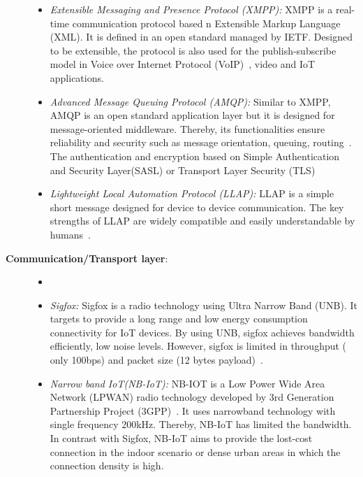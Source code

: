 \begin{description}
\begin{itemize}
    \item \textit{Extensible Messaging and Presence Protocol (XMPP): } XMPP  is a real-time communication protocol based n Extensible Markup Language (XML). It is defined in an open standard managed by IETF. Designed to be extensible, the protocol is also used for the publish-subscribe model in Voice over Internet Protocol (VoIP)~, video and IoT applications. 
    
    \item \textit{Advanced Message Queuing Protocol (AMQP): } Similar to XMPP, AMQP is an open standard application layer but it is designed for message-oriented middleware. Thereby, its functionalities ensure reliability and security such as message orientation, queuing, routing~\cite{o2007toward}. The authentication and encryption based on Simple Authentication and Security Layer(SASL) or Transport Layer Security (TLS)
    
    \item \textit{Lightweight Local Automation Protocol (LLAP): } LLAP is a simple short message designed for device to device communication. The key strengths of LLAP are widely compatible and easily understandable by humans~\cite{starksm694:online}.
    
    \end{itemize}
    
\item[\textbf{Communication/Transport layer}:\\]
    \begin{itemize}
    \item[] 
    
    \item \textit{Sigfox: } Sigfox is a radio technology using Ultra Narrow Band (UNB). It targets to provide a long range and low energy consumption connectivity for IoT devices. By using UNB, sigfox achieves bandwidth efficiently, low noise levels. However, sigfox is limited in throughput ( only 100bps) and packet size (12 bytes payload)~\cite{}.
    
    \item \textit{Narrow band IoT(NB-IoT): } NB-IOT is a Low Power Wide Area Network (LPWAN) radio technology developed by 3rd Generation Partnership Project (3GPP)~\cite{grant20163gpp}. It uses narrowband technology with single frequency 200kHz. Thereby, NB-IoT has limited the bandwidth. In contrast with Sigfox, NB-IoT aims to provide the lost-cost connection in the indoor scenario or dense urban areas in which the connection density is high.
    

\end{itemize}
\end{description}
